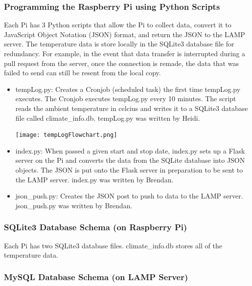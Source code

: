 \documentclass{article}
\begin{document}
			\subsubsection{Programming the Raspberry Pi using Python Scripts}
				Each Pi has 3 Python scripts that allow the Pi to collect data, convert it to JavaScript Object
				Notation (JSON) format, and return the JSON to the LAMP server. The temperature data is store locally
				in the SQLite3 database file for redundancy. For example, in the event that data transfer is interrupted
				during a pull request from the server, once the connection is remade, the data that was failed to send
				can still be resent from the local copy.

				\begin{itemize}
					\item tempLog.py: Creates a Cronjob (scheduled task) the first time tempLog.py executes. The Cronjob 
									  executes tempLog.py every 10 minutes. The script reads the ambient temperature
									  in celcius and writes it to a SQLite3 database file called climate\_info.db. tempLog.py was
									  written by Heidi.
						\begin{center}
							\texttt{[image: tempLogFlowchart.png]}\\
						\end{center}
					\item index.py: When passed a given start and stop date, index.py sets up a Flask server on the Pi and 
									converts the data from the SQLite database into JSON objects. The JSON is put onto the Flask server in
									preparation to be sent to the LAMP server. index.py was written by Brendan.
					\item json\_push.py: Creates the JSON post to push to data to the LAMP server. json\_push.py was written by Brendan.
				\end{itemize}
				
			\subsubsection{SQLite3 Database Schema (on Raspberry Pi)}	
				Each Pi has two SQLite3 database files. climate\_info.db stores all of the temperature data.
			
			\subsubsection{MySQL Database Schema (on LAMP Server)}
			
\end{document}

